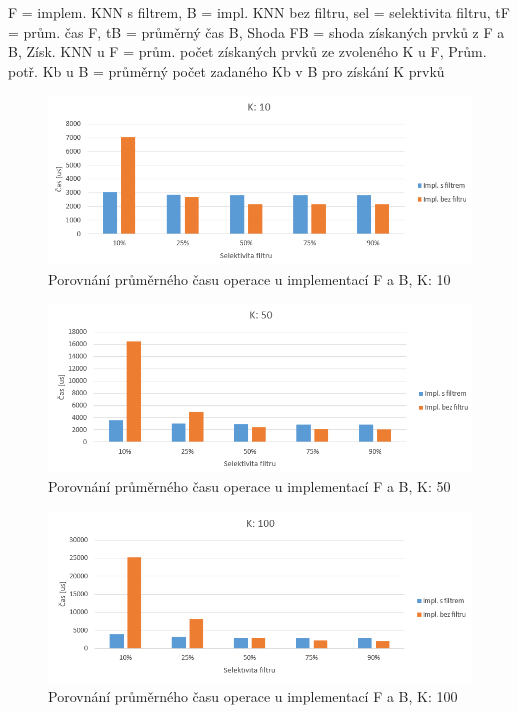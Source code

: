 \documentclass[czech,semestral,dept460,male,csharp,cpdeclaration]{diploma}
\begin{document}
\begin{center}
			{\footnotesize *F = implem. KNN s filtrem, B = impl. KNN bez filtru, sel = selektivita filtru, tF = prům. čas F, tB = průměrný čas B, Shoda FB = shoda získaných prvků z F a B, Získ. KNN u F = prům. počet získaných prvků ze zvoleného K u F, Prům. potř. Kb u B = průměrný počet zadaného Kb v B pro získání K prvků}\\
			
			
		\end{center}
		
		\label{graf_filtr_all}
		\begin{figure}
			\centering
			\includegraphics[scale=0.8]{Figures/graf_filtr_k10.png}
			\caption{Porovnání průměrného času operace u implementací F a B, K: 10}
			\label{graf_filtr_k10}
		\end{figure}
	
		\begin{figure}
			\centering
			\includegraphics[scale=0.8]{Figures/graf_filtr_k50.png}
			\caption{Porovnání průměrného času operace u implementací F a B, K: 50}
			\label{graf_filtr_k50}
		\end{figure}
	
		\begin{figure}
			\centering
			\includegraphics[scale=0.8]{Figures/graf_filtr_k100.png}
			\caption{Porovnání průměrného času operace u implementací F a B, K: 100}
			\label{graf_filtr_k100}
		\end{figure}
	
\end{document}
